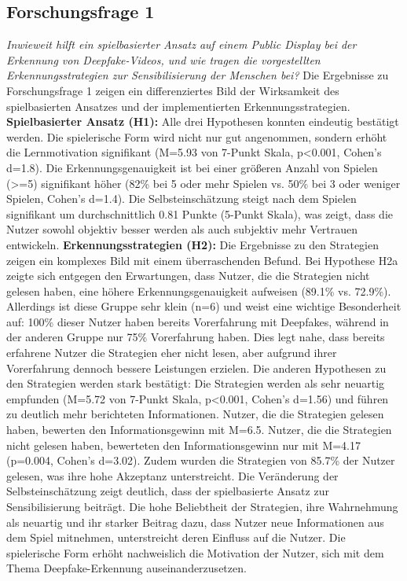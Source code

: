 \subsection{Forschungsfrage 1}
\textit{Inwieweit hilft ein spielbasierter Ansatz auf einem Public Display bei der Erkennung von Deepfake-Videos, 
und wie tragen die vorgestellten Erkennungsstrategien zur Sensibilisierung der Menschen bei?} 
Die Ergebnisse zu Forschungsfrage 1 zeigen ein differenziertes Bild der Wirksamkeit des spielbasierten Ansatzes und der implementierten Erkennungsstrategien. 
\textbf{Spielbasierter Ansatz (H1):} 
Alle drei Hypothesen konnten eindeutig bestätigt werden. Die spielerische Form wird nicht nur gut angenommen, 
sondern erhöht die Lernmotivation signifikant (M=5.93 von 7-Punkt Skala, p<0.001, Cohen's d=1.8). 
Die Erkennungsgenauigkeit ist bei einer größeren Anzahl von Spielen (>=5) signifikant höher 
(82\% bei 5 oder mehr Spielen vs. 50\% bei 3 oder weniger Spielen, Cohen's d=1.4). 
Die Selbsteinschätzung steigt nach dem Spielen signifikant um durchschnittlich 0.81 Punkte (5-Punkt Skala), 
was zeigt, dass die Nutzer sowohl objektiv besser werden als auch subjektiv mehr Vertrauen entwickeln. 
\textbf{Erkennungsstrategien (H2):}
Die Ergebnisse zu den Strategien zeigen ein komplexes Bild mit einem überraschenden Befund. 
Bei Hypothese H2a zeigte sich entgegen den Erwartungen, dass Nutzer, die die Strategien nicht gelesen haben, 
eine höhere Erkennungsgenauigkeit aufweisen (89.1\% vs. 72.9\%). 
Allerdings ist diese Gruppe sehr klein (n=6) und weist eine wichtige Besonderheit auf: 
100\% dieser Nutzer haben bereits Vorerfahrung mit Deepfakes, während in der anderen Gruppe nur 75\% Vorerfahrung haben. 
Dies legt nahe, dass bereits erfahrene Nutzer die Strategien eher nicht lesen, aber aufgrund ihrer Vorerfahrung dennoch bessere Leistungen erzielen.
Die anderen Hypothesen zu den Strategien werden stark bestätigt: 
Die Strategien werden als sehr neuartig empfunden (M=5.72 von 7-Punkt Skala, p<0.001, Cohen's d=1.56) und führen zu deutlich mehr berichteten Informationen. 
Nutzer, die die Strategien gelesen haben, bewerten den Informationsgewinn mit M=6.5. Nutzer, die die Strategien nicht gelesen haben, 
bewerteten den Informationsgewinn nur mit M=4.17 (p=0.004, Cohen's d=3.02). 
Zudem wurden die Strategien von 85.7\% der Nutzer gelesen, was ihre hohe Akzeptanz unterstreicht.
Die Veränderung der Selbsteinschätzung zeigt deutlich, dass der spielbasierte Ansatz zur Sensibilisierung beiträgt. 
Die hohe Beliebtheit der Strategien, ihre Wahrnehmung als neuartig und ihr starker Beitrag dazu, dass Nutzer neue Informationen aus dem Spiel mitnehmen, 
unterstreicht deren Einfluss auf die Nutzer. 
Die spielerische Form erhöht nachweislich die Motivation der Nutzer, sich mit dem Thema Deepfake-Erkennung auseinanderzusetzen. 


